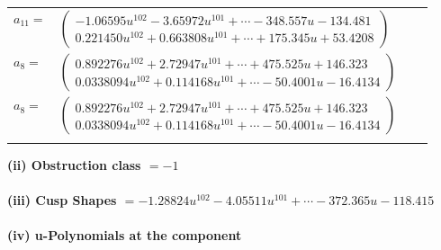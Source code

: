 \documentclass[1p]{elsarticle_modified}
\theoremstyle{definition}
\begin{document}
\begin{tabular}{m{7pt} m{180pt} m{7pt} m{180pt} }
\flushright $a_{11}=$&$\begin{pmatrix}-1.06595 u^{102}-3.65972 u^{101}+\cdots-348.557 u-134.481\\0.221450 u^{102}+0.663808 u^{101}+\cdots+175.345 u+53.4208\end{pmatrix}$ \\
\flushright $a_{8}=$&$\begin{pmatrix}0.892276 u^{102}+2.72947 u^{101}+\cdots+475.525 u+146.323\\0.0338094 u^{102}+0.114168 u^{101}+\cdots-50.4001 u-16.4134\end{pmatrix}$\\ \flushright $a_{8}=$&$\begin{pmatrix}0.892276 u^{102}+2.72947 u^{101}+\cdots+475.525 u+146.323\\0.0338094 u^{102}+0.114168 u^{101}+\cdots-50.4001 u-16.4134\end{pmatrix}$\\&\end{tabular}
\flushleft \textbf{(ii) Obstruction class $= -1$}\\~\\
\flushleft \textbf{(iii) Cusp Shapes $= -1.28824 u^{102}-4.05511 u^{101}+\cdots-372.365 u-118.415$}\\~\\
\newpage\renewcommand{\arraystretch}{1}
\flushleft \textbf{(iv) u-Polynomials at the component}\newline \\
\end{document}
